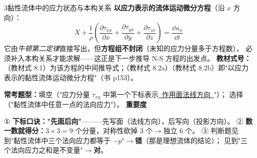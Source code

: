 \begin{kaodian}{3}{黏性流体中的应力状态与本构关系}
\textbf{以应力表示的流体运动微分方程}（沿 $x$ 方向）：
\[ X+\frac{1}{\rho}\left(\frac{\partial\tau_{xx}}{\partial x}+\frac{\partial\tau_{yx}}{\partial y}+\frac{\partial\tau_{zx}}{\partial z}\right)=\frac{\dd u_x}{\dd t} \]
它由\emph{牛顿第二定律}直接写出，但\textbf{方程组不封闭}（未知的应力分量多于方程数），
必须补入本构关系才能求解——这正是下一步推导 N-S 方程的出发点。
\textbf{教材式号：}（教材式 8.1）为该方程的中间推导式；（教材式 8.2a）（教材式 8.2b）即"以应力表示的黏性流体运动微分方程"（书 p153）。

\textbf{常考题型：}填空（"应力分量 $\tau_{xy}$ 中第一个下标表示\underline{\ 作用面法线方向\ }"）；
选择（"黏性流体中任意一点的法向应力"）。
\textbf{重要度 }\quad{}\quad{}

\begin{banfa}
① \textbf{下标口诀："先面后向"}———先写面（法线方向），后写向（投影方向）。
② \textbf{数一数就得分：}$3\times3=9$ 个分量，对称性砍掉 3 个$\to$独立 6 个。
③ 判断题见到"黏性流体中三个法向应力都等于 $-p$"$\to$\textbf{错}（那是理想流体的结论）；
见到"三个法向应力之和是不变量"$\to$\textbf{对}。
\end{banfa}
\end{kaodian}

